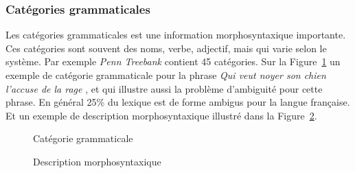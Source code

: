\subsubsection{Catégories grammaticales}
Les catégories grammaticales est une information morphosyntaxique importante. Ces catégories sont souvent des noms, verbe, adjectif, mais qui varie selon le système. Par exemple \textit{Penn Treebank} contient 45 catégories. Sur la Figure~\ref{fig:categorie-grammaticale} un exemple de catégorie grammaticale pour la phrase \textit{\og Qui veut noyer son chien l’accuse de la rage \fg{}}, et qui illustre aussi la problème d'ambiguité pour cette phrase. En général 25\% du lexique est de forme ambigus pour la langue française. Et un exemple de description morphosyntaxique illustré dans la Figure~\ref{fig:exemple-desc-morphosyntaxique}.

\begin{figure}[htbp]
    \begin{center}
    \end{center}
    \caption{Catégorie grammaticale \citep{handbook-nlp}}
    \label{fig:categorie-grammaticale}
\end{figure}

\begin{figure}[htbp]
    \begin{center}
    \end{center}
    \caption{Description morphosyntaxique \citep{handbook-nlp}}
    \label{fig:exemple-desc-morphosyntaxique}
\end{figure}

